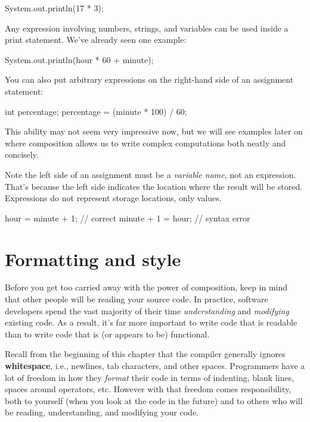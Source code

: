 \begin{code}
    System.out.println(17 * 3);
\end{code}

Any expression involving numbers, strings, and variables can be used inside a print statement.
We've already seen one example:

\begin{code}
    System.out.println(hour * 60 + minute);
\end{code}

You can also put arbitrary expressions on the right-hand side of an assignment statement:

\begin{code}
    int percentage;
    percentage = (minute * 100) / 60;
\end{code}

This ability may not seem very impressive now, but we will see examples later on where composition allows us to write complex computations both neatly and concisely.

Note the left side of an assignment must be a {\em variable name}, not an expression.
That's because the left side indicates the location where the result will be stored.
Expressions do not represent storage locations, only values.

\begin{code}
    hour = minute + 1;  // correct
    minute + 1 = hour;  // syntax error
\end{code}


\section{Formatting and style}


Before you get too carried away with the power of composition, keep in mind that other people will be reading your source code.
In practice, software developers spend the vast majority of their time {\em understanding} and {\em modifying} existing code.
As a result, it's far more important to write code that is readable than to write code that is (or appears to be) functional.


Recall from the beginning of this chapter that the compiler generally ignores {\bf whitespace}, i.e., newlines, tab characters, and other spaces.
Programmers have a lot of freedom in how they {\em format} their code in terms of indenting, blank lines, spaces around operators, etc.
However with that freedom comes responsibility, both to yourself (when you look at the code in the future) and to others who will be reading, understanding, and modifying your code.


